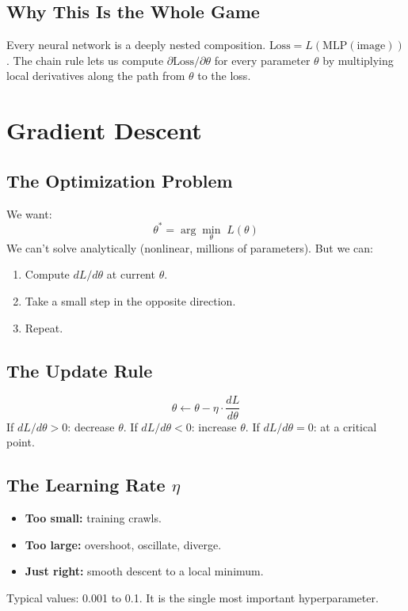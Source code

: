 \documentclass[11pt,a4paper]{book}
\begin{document}
\section{Why This Is the Whole Game}

Every neural network is a deeply nested composition. $\text{Loss} = L(\text{MLP}(\text{image}))$.
The chain rule lets us compute $\partial\text{Loss}/\partial\theta$ for every parameter $\theta$ by multiplying local derivatives along the path from $\theta$ to the loss.

\chapter{Gradient Descent}\label{ch:gradientdescent}

\section{The Optimization Problem}

We want:
\begin{equation}
    \theta^* = \arg\min_\theta \; L(\theta)
\end{equation}
We can't solve analytically (nonlinear, millions of parameters). But we can:
\begin{enumerate}[leftmargin=*]
    \item Compute $dL/d\theta$ at current $\theta$.
    \item Take a small step in the opposite direction.
    \item Repeat.
\end{enumerate}

\section{The Update Rule}

\begin{equation}
    \theta \leftarrow \theta - \eta \cdot \frac{dL}{d\theta}
\end{equation}
If $dL/d\theta > 0$: decrease $\theta$. If $dL/d\theta < 0$: increase $\theta$. If $dL/d\theta = 0$: at a critical point.

\section{The Learning Rate $\eta$}

\begin{itemize}[leftmargin=*]
    \item \textbf{Too small:} training crawls.
    \item \textbf{Too large:} overshoot, oscillate, diverge.
    \item \textbf{Just right:} smooth descent to a local minimum.
\end{itemize}
Typical values: 0.001 to 0.1. It is the single most important hyperparameter.
\end{document}
